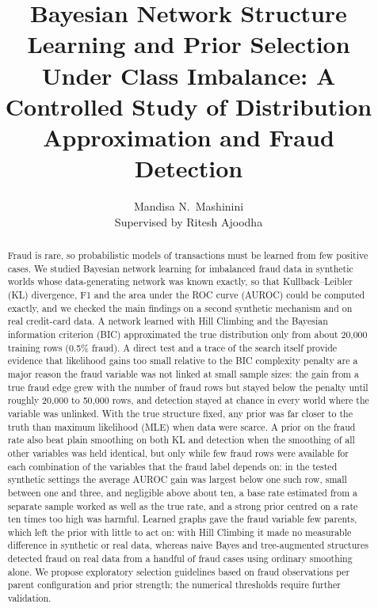 \documentclass[final,5p,times,authoryear]{elsarticle}
\begin{document}
\begin{frontmatter}

\title{Bayesian Network Structure Learning and Prior Selection Under Class Imbalance: A Controlled Study of Distribution Approximation and Fraud Detection}

\author{Mandisa N.\ Mashinini\\[3pt]\normalfont\small Supervised by Ritesh Ajoodha}

\begin{abstract}
Fraud is rare, so probabilistic models of transactions must be learned from few positive cases. We studied Bayesian network learning for imbalanced fraud data in synthetic worlds whose data-generating network was known exactly, so that Kullback--Leibler (KL) divergence, F1 and the area under the ROC curve (AUROC) could be computed exactly, and we checked the main findings on a second synthetic mechanism and on real credit-card data. A network learned with Hill Climbing and the Bayesian information criterion (BIC) approximated the true distribution only from about 20,000 training rows (0.5\% fraud). A direct test and a trace of the search itself provide evidence that likelihood gains too small relative to the BIC complexity penalty are a major reason the fraud variable was not linked at small sample sizes: the gain from a true fraud edge grew with the number of fraud rows but stayed below the penalty until roughly 20,000 to 50,000 rows, and detection stayed at chance in every world where the variable was unlinked. With the true structure fixed, any prior was far closer to the truth than maximum likelihood (MLE) when data were scarce. A prior on the fraud rate also beat plain smoothing on both KL and detection when the smoothing of all other variables was held identical, but only while few fraud rows were available for each combination of the variables that the fraud label depends on: in the tested synthetic settings the average AUROC gain was largest below one such row, small between one and three, and negligible above about ten, a base rate estimated from a separate sample worked as well as the true rate, and a strong prior centred on a rate ten times too high was harmful. Learned graphs gave the fraud variable few parents, which left the prior with little to act on: with Hill Climbing it made no measurable difference in synthetic or real data, whereas naive Bayes and tree-augmented structures detected fraud on real data from a handful of fraud cases using ordinary smoothing alone. We propose exploratory selection guidelines based on fraud observations per parent configuration and prior strength; the numerical thresholds require further validation.
\end{abstract}




\end{frontmatter}
\end{document}
